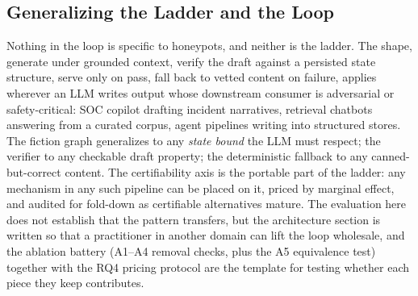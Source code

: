 \subsection{Generalizing the Ladder and the Loop}
Nothing in the loop is specific to honeypots, and neither is the ladder.
The shape, generate under
grounded context, verify the draft against a persisted state structure,
serve only on pass, fall back to vetted content on failure, applies
wherever an LLM writes output whose downstream consumer is adversarial or
safety-critical: SOC copilot drafting incident narratives, retrieval
chatbots answering from a curated corpus, agent pipelines writing into
structured stores. The fiction graph generalizes to any \emph{state
bound} the LLM must respect; the verifier to any checkable draft
property; the deterministic fallback to any canned-but-correct content.
The certifiability axis is the portable part of the ladder: any
mechanism in any such pipeline can be placed on it, priced by marginal
effect, and audited for fold-down as certifiable alternatives mature.
The evaluation here does not establish that the
pattern transfers, but the
architecture section is written so that a practitioner in another domain
can lift the loop wholesale, and the ablation battery (A1--A4 removal
checks, plus the A5 equivalence test) together with the RQ4 pricing
protocol are the template for testing whether each piece they keep
contributes.

